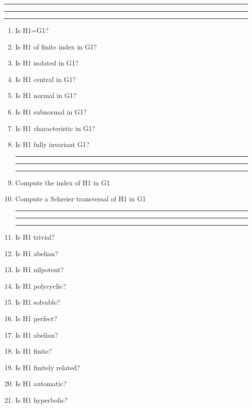 
\bigskip
\hrule\hrule\hrule

\begin{enumerate}

\item Is H1=G1?

\item Is H1 of finite index in G1?

\item Is H1 isolated in G1?

\item Is H1 central in G1?

\item Is H1 normal in G1?

\item Is H1 subnormal in G1?

\item Is H1 characteristic in G1?

\item Is H1 fully invariant G1?

\bigskip
\hrule\hrule\hrule

\item Compute the index of H1 in G1

\item Compute a Schreier transversal of H1 in G1

\bigskip
\hrule\hrule\hrule

\item Is H1 trivial?

\item Is H1 abelian?

\item Is H1 nilpotent?

\item Is H1 polycyclic?

\item Is H1 solvable?

\item Is H1 perfect?

\item Is H1 abelian?

\item Is H1 finite?

\item Is H1 finitely related?

\item Is H1 automatic?

\item Is H1 hyperbolic?


\end{enumerate}
